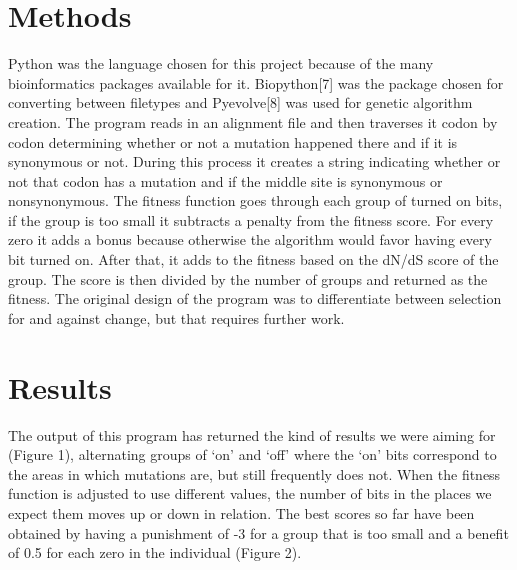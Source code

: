\documentclass{article}
\begin{document}
\section{Methods}
Python was the language chosen for this project because of the many bioinformatics packages available for it.  Biopython[7] was the package chosen for converting between filetypes and Pyevolve[8] was used for genetic algorithm creation. The program reads in an alignment file and then traverses it codon by codon determining whether or not a mutation happened there and if it is synonymous or not.  During this process it creates a string indicating whether or not that codon has a mutation and if the middle site is synonymous or nonsynonymous.  The fitness function goes through each group of turned on bits, if the group is too small it subtracts a penalty from the fitness score. For every zero it adds a bonus because otherwise the algorithm would favor having every bit turned on.  After that, it adds to the fitness based on the dN/dS score of the group.  The score is then divided by the number of groups and returned as the fitness.  The original design of the program was to differentiate between selection for and against change, but that requires further work.

\section{Results}
The output of this program has returned the kind of results we were aiming for (Figure 1), alternating groups of ‘on’ and ‘off’ where the ‘on’ bits correspond to the areas in which mutations are, but still frequently does not.  When the fitness function is adjusted to use different values, the number of bits in the places we expect them moves up or down in relation.  The best scores so far have been obtained by having a punishment of -3 for a group that is too small and a benefit of 0.5 for each zero in the individual (Figure 2).
\end{document}
